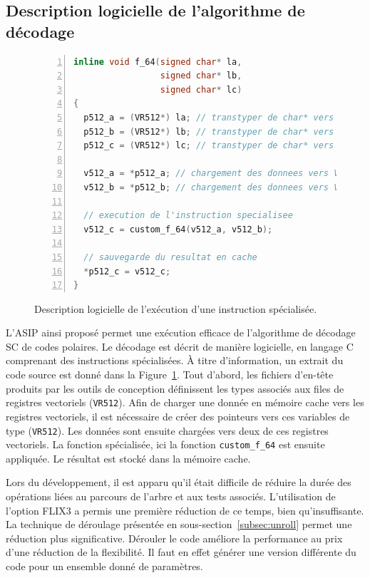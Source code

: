 \subsection{Description logicielle de l'algorithme de décodage}
\begin{figure}[t]
\begin{lstlisting}[language=C++, numbers=left, numbersep=0.3em, tabsize=2, basicstyle=\footnotesize\ttfamily]
inline void f_64(signed char* la, 
                 signed char* lb, 
                 signed char* lc)
{
  p512_a = (VR512*) la; // transtyper de char* vers VR512
  p512_b = (VR512*) lb; // transtyper de char* vers VR512
  p512_c = (VR512*) lc; // transtyper de char* vers VR512

  v512_a = *p512_a; // chargement des donnees vers VR512
  v512_b = *p512_b; // chargement des donnees vers VR512
  
  // execution de l'instruction specialisee
  v512_c = custom_f_64(v512_a, v512_b); 
  
  // sauvegarde du resultat en cache
  *p512_c = v512_c;     
}
\end{lstlisting}
\caption{Description logicielle de l'exécution d'une instruction spécialisée.}
\label{fig:f_code}
\end{figure}
L'ASIP ainsi proposé permet une exécution efficace de l'algorithme de décodage SC de codes polaires. Le décodage est décrit de manière logicielle, en langage C comprenant des instructions spécialisées. \`A titre d'information, un extrait du code source est donné dans la Figure~\ref{fig:f_code}. Tout d'abord, les fichiers d'en-tête produits par les outils de conception définissent les types associés aux files de registres vectoriels (\texttt{VR512}). Afin de charger une donnée en mémoire cache vers les registres vectoriels, il est nécessaire de créer des pointeurs vers ces variables de type (\texttt{VR512}). Les données sont ensuite chargées vers deux de ces registres vectoriels. La fonction spécialisée, ici la fonction \texttt{custom\_f\_64} est ensuite appliquée. Le résultat est stocké dans la mémoire cache.

Lors du développement, il est apparu qu'il était difficile de réduire la durée des opérations liées au parcours de l'arbre et aux tests associés. L'utilisation de l'option FLIX3 a permis une première réduction de ce temps, bien qu'insuffisante. La technique de déroulage présentée en sous-section~\ref{subsec:unroll} permet une réduction plus significative. Dérouler le code améliore la performance au prix d'une réduction de la flexibilité. Il faut en effet générer une version différente du code pour un ensemble donné de paramètres.


